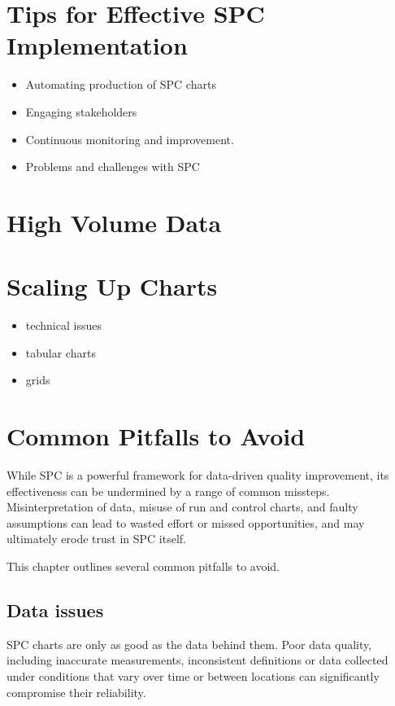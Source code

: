 \documentclass[
]{book}
\providecommand{\tightlist}{%
  \setlength{\itemsep}{0pt}\setlength{\parskip}{0pt}}
\begin{document}
\chapter{Tips for Effective SPC Implementation}\label{tips-for-effective-spc-implementation}

\begin{itemize}
\tightlist
\item
  Automating production of SPC charts
\item
  Engaging stakeholders
\item
  Continuous monitoring and improvement.
\item
  Problems and challenges with SPC
\end{itemize}

\chapter{High Volume Data}\label{high-volume-data}

\chapter{Scaling Up Charts}\label{scaling-up-charts}

\begin{itemize}
\tightlist
\item
  technical issues
\item
  tabular charts
\item
  grids
\end{itemize}

\chapter{Common Pitfalls to Avoid}\label{common-pitfalls-to-avoid}

While SPC is a powerful framework for data-driven quality improvement, its effectiveness can be undermined by a range of common missteps. Misinterpretation of data, misuse of run and control charts, and faulty assumptions can lead to wasted effort or missed opportunities, and may ultimately erode trust in SPC itself.

This chapter outlines several common pitfalls to avoid.

\section{Data issues}\label{data-issues}

SPC charts are only as good as the data behind them. Poor data quality, including inaccurate measurements, inconsistent definitions or data collected under conditions that vary over time or between locations can significantly compromise their reliability.
\end{document}
